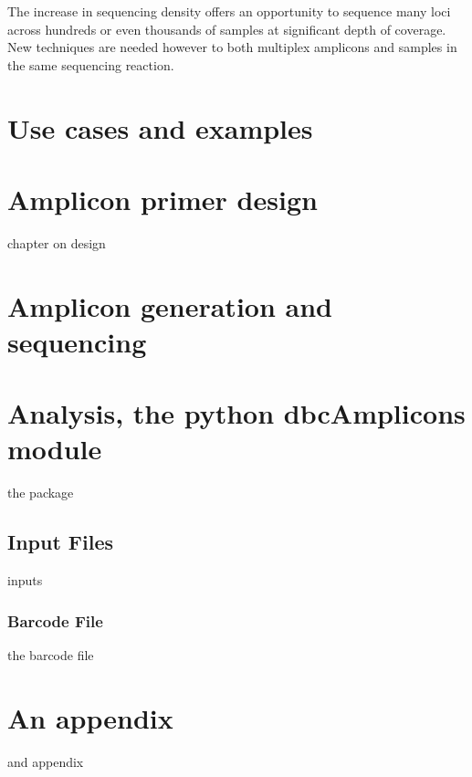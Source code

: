 \documentclass[10pt,oneside]{memoir}
\begin{document}
The increase in sequencing density offers an opportunity to sequence many loci across hundreds or even thousands of samples at significant depth of coverage. New techniques are needed however to both multiplex amplicons and samples in the same sequencing reaction.

\clearpage

\tableofcontents

\clearpage


\mainmatter

\chapter{Use cases and examples}

\chapter{Amplicon primer design}
chapter on design

\chapter{Amplicon generation and sequencing}

\chapter{Analysis, the python dbcAmplicons module}
the package
\section{Input Files}
inputs
\subsection{Barcode File}
the barcode file

\appendix
\chapter{An appendix}
and appendix

\backmatter
\end{document}
